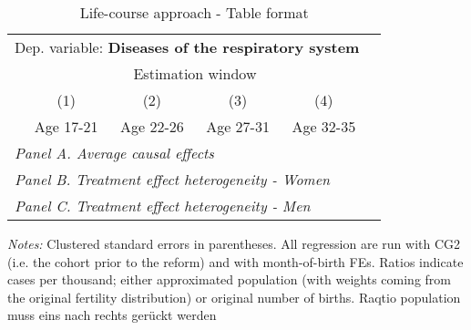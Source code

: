  \begin{table}[H] \centering \begin{threeparttable} \caption{Life-course approach - Table format} {\def\sym#1{\ifmmode^{#1}\else\(^{#1}\)\fi} \begin{tabular}{l*{5}{c}} \toprule \multicolumn{5}{l}{Dep. variable: \textbf{Diseases of the respiratory system}} \\ & \multicolumn{4}{c}{Estimation window} \\ \cmidrule(lr){2-5}
            &\multicolumn{1}{c}{(1)}&\multicolumn{1}{c}{(2)}&\multicolumn{1}{c}{(3)}&\multicolumn{1}{c}{(4)}\\
            &\multicolumn{1}{c}{Age 17-21}&\multicolumn{1}{c}{Age 22-26}&\multicolumn{1}{c}{Age 27-31}&\multicolumn{1}{c}{Age 32-35}\\
\midrule
 \multicolumn{5}{l}{\emph{Panel A. Average causal effects}} \\      \midrule\multicolumn{5}{l}{\emph{Panel B. Treatment effect heterogeneity - Women}} \\      \midrule\multicolumn{5}{l}{\emph{Panel C. Treatment effect heterogeneity - Men}} \\      
\bottomrule \end{tabular} } \begin{tablenotes} \item \scriptsize \emph{Notes:} Clustered standard errors in parentheses. All regression are run with CG2 (i.e. the cohort prior to the reform) and with month-of-birth FEs. Ratios indicate cases per thousand; either approximated population (with weights coming from the original fertility distribution) or original number of births. Raqtio population muss eins nach rechts gerückt werden \end{tablenotes} \end{threeparttable} \end{table} 
